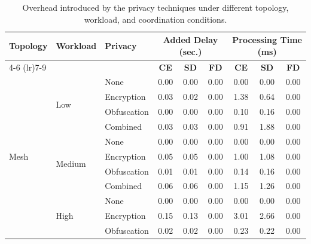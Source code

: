\begin{table}[!t]
\centering
\caption{Overhead introduced by the privacy techniques under different topology, workload, and coordination conditions.}
\label{tab:privacy_overhead}
\setlength{\tabcolsep}{6pt}
\begin{tabular}{lllccc ccc}
\toprule
\multirow{2}{*}{\textbf{Topology}} & \multirow{2}{*}{\textbf{Workload}} & \multirow{2}{*}{\textbf{Privacy}}
& \multicolumn{3}{c}{\textbf{Added Delay (sec.)}} & \multicolumn{3}{c}{\textbf{Processing Time (ms)}} \\
\cmidrule(lr){4-6}
\cmidrule(lr){7-9}
& & & \textbf{CE} & \textbf{SD} & \textbf{FD} & \textbf{CE} & \textbf{SD} & \textbf{FD} \\
\midrule
\multirow{12}{*}{Mesh} & \multirow{4}{*}{Low} & None & \cellcolor[gray]{0.70}0.00 & \cellcolor[gray]{0.70}0.00 & \cellcolor[gray]{0.70}0.00 & \cellcolor[gray]{0.70}0.00 & \cellcolor[gray]{0.70}0.00 & \cellcolor[gray]{0.70}0.00 \\
 &  & Encryption & 0.03 & 0.02 & \cellcolor[gray]{0.70}0.00 & 1.38 & 0.64 & \cellcolor[gray]{0.70}0.00 \\
 &  & Obfuscation & 0.00 & 0.00 & \cellcolor[gray]{0.70}0.00 & 0.10 & 0.16 & \cellcolor[gray]{0.70}0.00 \\
 &  & Combined & 0.03 & 0.03 & \cellcolor[gray]{0.70}0.00 & 0.91 & 1.88 & \cellcolor[gray]{0.70}0.00 \\
\cmidrule(lr){2-9}
 & \multirow{4}{*}{Medium} & None & \cellcolor[gray]{0.70}0.00 & \cellcolor[gray]{0.70}0.00 & \cellcolor[gray]{0.70}0.00 & \cellcolor[gray]{0.70}0.00 & \cellcolor[gray]{0.70}0.00 & \cellcolor[gray]{0.70}0.00 \\
 &  & Encryption & 0.05 & 0.05 & \cellcolor[gray]{0.70}0.00 & 1.00 & 1.08 & \cellcolor[gray]{0.70}0.00 \\
 &  & Obfuscation & 0.01 & 0.01 & \cellcolor[gray]{0.70}0.00 & 0.14 & 0.16 & \cellcolor[gray]{0.70}0.00 \\
 &  & Combined & 0.06 & 0.06 & \cellcolor[gray]{0.70}0.00 & 1.15 & 1.26 & \cellcolor[gray]{0.70}0.00 \\
\cmidrule(lr){2-9}
 & \multirow{4}{*}{High} & None & \cellcolor[gray]{0.70}0.00 & \cellcolor[gray]{0.70}0.00 & \cellcolor[gray]{0.70}0.00 & \cellcolor[gray]{0.70}0.00 & \cellcolor[gray]{0.70}0.00 & \cellcolor[gray]{0.70}0.00 \\
 &  & Encryption & 0.15 & 0.13 & \cellcolor[gray]{0.70}0.00 & 3.01 & 2.66 & \cellcolor[gray]{0.70}0.00 \\
 &  & Obfuscation & 0.02 & 0.02 & \cellcolor[gray]{0.70}0.00 & 0.23 & 0.22 & \cellcolor[gray]{0.70}0.00 \\

\end{tabular}
\end{table}

